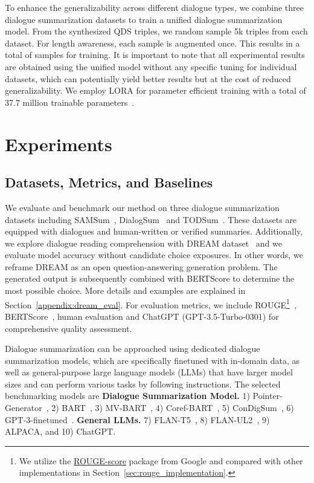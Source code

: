 \documentclass[11pt]{article}
\begin{document}
        To enhance the generalizability across different dialogue types, we combine three dialogue summarization datasets to train a unified dialogue summarization model. From the synthesized QDS triples, we random sample 5k triples from each dataset. For length awareness, each sample is augmented once. This results in a total of  samples for training. It is important to note that all experimental results are obtained using the unified model without any specific tuning for individual datasets, which can potentially yield better results but at the cost of reduced generalizability. We employ LORA for parameter efficient training with a total of 37.7 million trainable parameters~\cite{hu2022lora}.


\section{Experiments}

    \subsection{Datasets, Metrics, and Baselines}

        We evaluate and benchmark our method on three dialogue summarization datasets including SAMSum~\cite{gliwa-etal-2019-samsum}, DialogSum~\cite{chen-etal-2021-dialogsum} and TODSum~\cite{zhao2021todsum}. These datasets are equipped with dialogues and human-written or verified summaries. Additionally, we explore dialogue reading comprehension with DREAM dataset~\cite{sun-etal-2019-dream} and we evaluate model accuracy without candidate choice exposures. In other words, we reframe DREAM as an open question-answering generation problem. The generated output is subsequently combined with BERTScore to determine the most possible choice. More details and examples are explained in Section~\ref{appendix:dream_eval}. For evaluation metrics, we include ROUGE\footnote{We utilize the \href{https://pypi.org/project/rouge-score/0.1.2/}{ROUGE-score} package from Google and compared with other implementations in Section~\ref{sec:rouge_implementation}.}~\cite{lin-2004-rouge}, BERTScore~\cite{bert-score}, human evaluation and ChatGPT (GPT-3.5-Turbo-0301) for comprehensive quality assessment.


        Dialogue summarization can be approached using dedicated dialogue summarization models, which are specifically finetuned with in-domain data, as well as general-purpose large language models (LLMs) that have larger model sizes and can perform various tasks by following instructions. The selected benchmarking models are \textbf{Dialogue Summarization Model.} 1) Pointer-Generator~\cite{see-etal-2017-get}, 2) BART~\cite{lewis-etal-2020-bart}, 3) MV-BART~\cite{chen-yang-2020-multi}, 4) Coref-BART~\cite{liu-etal-2021-coreference}, 5) ConDigSum~\cite{liu-etal-2021-topic-aware}, 6) GPT-3-finetuned~\cite{hu2022lora}. \textbf{General LLMs.} 7) FLAN-T5~\cite{chung2022scaling}, 8) FLAN-UL2~\cite{tay2022ul2}, 9) ALPACA, and 10) ChatGPT.
\end{document}
